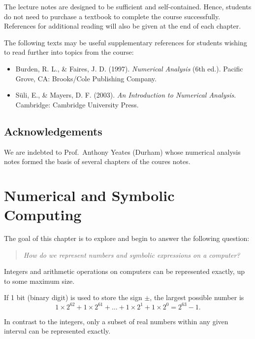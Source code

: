 \documentclass[
  letterpaper,
  DIV=11,
  numbers=noendperiod]{scrreprt}
\providecommand{\tightlist}{%
  \setlength{\itemsep}{0pt}\setlength{\parskip}{0pt}}
\begin{document}
The lecture notes are designed to be sufficient and self-contained.
Hence, students do not need to purchase a textbook to complete the
course successfully. References for additional reading will also be
given at the end of each chapter.

The following texts may be useful supplementary references for students
wishing to read further into topics from the course:

\begin{itemize}
\tightlist
\item
  Burden, R. L., \& Faires, J. D. (1997). \emph{Numerical Analysis} (6th
  ed.). Pacific Grove, CA: Brooks/Cole Publishing Company.
\item
  Süli, E., \& Mayers, D. F. (2003). \emph{An Introduction to Numerical
  Analysis}. Cambridge: Cambridge University Press.
\end{itemize}

\section*{Acknowledgements}\label{acknowledgements}


We are indebted to Prof.~Anthony Yeates (Durham) whose numerical
analysis notes formed the basis of several chapters of the coures notes.


\chapter{Numerical and Symbolic
Computing}\label{numerical-and-symbolic-computing}

The goal of this chapter is to explore and begin to answer the following
question:

\begin{quote}
\emph{How do we represent numbers and symbolic expressions on a
computer?}
\end{quote}

Integers and arithmetic operations on computers can be represented
exactly, up to some maximum size.

If 1 bit (binary digit) is used to store the sign \(\pm\), the largest
possible number is \[
1\times 2^{62} +1\times 2^{61} + \ldots + 1\times 2^{1} + 1\times 2^{0} = 2^{63}-1.
\]

In contrast to the integers, only a subset of real numbers within any
given interval can be represented exactly.
\end{document}

